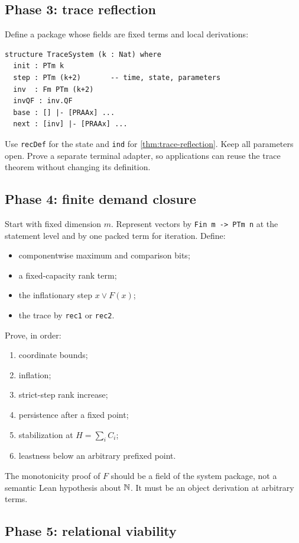 \subsection{Phase 3: trace reflection}

Define a package whose fields are fixed terms and local derivations:
\begin{lstlisting}[language={}]
structure TraceSystem (k : Nat) where
  init : PTm k
  step : PTm (k+2)       -- time, state, parameters
  inv  : Fm PTm (k+2)
  invQF : inv.QF
  base : [] |- [PRAAx] ...
  next : [inv] |- [PRAAx] ...
\end{lstlisting}
Use \texttt{recDef} for the state and \texttt{ind} for \cref{thm:trace-reflection}.  Keep all parameters open.  Prove a separate terminal adapter, so applications can reuse the trace theorem without changing its definition.

\subsection{Phase 4: finite demand closure}

Start with fixed dimension \(m\).  Represent vectors by \texttt{Fin m -> PTm n} at the statement level and by one packed term for iteration.  Define:
\begin{itemize}[leftmargin=2em]
\item componentwise maximum and comparison bits;
\item a fixed-capacity rank term;
\item the inflationary step \(x\vee F(x)\);
\item the trace by \texttt{rec1} or \texttt{rec2}.
\end{itemize}
Prove, in order:
\begin{enumerate}[label=(\roman*),leftmargin=2.3em]
\item coordinate bounds;
\item inflation;
\item strict-step rank increase;
\item persistence after a fixed point;
\item stabilization at \(H=\sum_iC_i\);
\item leastness below an arbitrary prefixed point.
\end{enumerate}
The monotonicity proof of \(F\) should be a field of the system package, not a semantic Lean hypothesis about \(\mathbb N\).  It must be an object derivation at arbitrary terms.

\subsection{Phase 5: relational viability}

